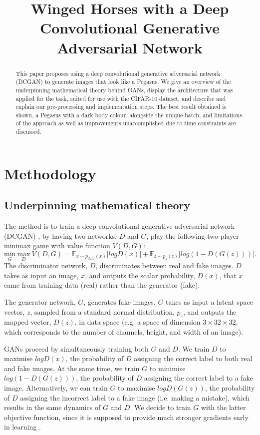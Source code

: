 \documentclass{article}
\title{Winged Horses with a Deep Convolutional Generative Adversarial Network}
\begin{document}
\maketitle
\begin{abstract}
    This paper proposes using a deep convolutional generative adversarial network (DCGAN) to generate images that look like a Pegasus. We give an overview of the underpinning mathematical theory behind GANs, display the architecture that was applied for the task, suited for use with the CIFAR-10 dataset, and describe and explain our pre-processing and implementation steps. The best result obtained is shown, a Pegasus with a dark body colour, alongside the unique batch, and limitations of the approach as well as improvements unaccomplished due to time constraints are discussed.
\end{abstract}

\section{Methodology}
\subsection{Underpinning mathematical theory}
The method is to train a deep convolutional generative adversarial network (DCGAN) \cite{article}, by having two networks, $D$ and $G$, play the following two-player minimax game with value function $V(D, G)$: 
\begin{equation}
    \underset{G}{\text{min}} \ \underset{D}{\text{max}} \ V(D,G) = \mathbb{E}_{x\sim p_{data}(x)}\big[logD(x)\big] + \mathbb{E}_{z\sim p_{z}(z)}\big[log(1-D(G(z)))\big].
\end{equation}
The discriminator network, $D$, discriminates between real and fake images. $D$ takes as input an image, $x$, and outputs the scalar probability, $D(x)$, that $x$ came from training data (real) rather than the generator (fake). 

The generator network, $G$, generates fake images. $G$ takes as input a latent space vector, $z$, sampled from a standard normal distribution, $p_z$, and outputs the mapped vector, $D(z)$, in data space (e.g. a space of dimension $3 \times 32 \times 32$, which corresponds to the number of channels, height, and width of an image). 

GANs proceed by simultaneously training both $G$ and $D$. We train $D$ to maximise $logD(x)$, the probability of $D$ assigning the correct label to both real and fake images. At the same time, we train $G$ to minimise $log(1-D(G(z)))$, the probability of $D$ assigning the correct label to a fake image. Alternatively, we can train $G$ to maximise $logD(G(z))$, the probability of $D$ assigning the incorrect label to a fake image (i.e. making a mistake), which results in the same dynamics of $G$ and $D$. We decide to train $G$ with the latter objective function, since it is supposed to provide much stronger gradients early in learning \cite{NIPS2014_5ca3e9b1}.
\end{document}
